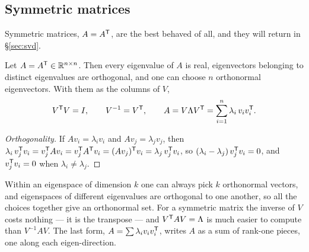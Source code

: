 \documentclass[11pt]{article}
\begin{document}
\subsection{Symmetric matrices}\label{sec:symmetric}
Symmetric matrices, $A=A^{\mathsf{T}}$, are the best behaved of all, and they will return in
\S\ref{sec:svd}.
\begin{theorem}\label{thm:spectral}
Let $A=A^{\mathsf{T}}\in\mathbb{R}^{n\times n}$. Then every eigenvalue of $A$ is real, eigenvectors
belonging to distinct eigenvalues are orthogonal, and one can choose $n$
orthonormal eigenvectors. With them as the columns of $V$,
\[
   V^{\mathsf{T}} V=I,\qquad V^{-1}=V^{\mathsf{T}},\qquad
   A = V\Lambda V^{\mathsf{T}} = \sum_{i=1}^{n}\lambda_i\,v_iv_i^{\mathsf{T}} .
\]
\end{theorem}
\begin{proof}[Orthogonality]
If $Av_i=\lambda_iv_i$ and $Av_j=\lambda_jv_j$, then
$\lambda_i\,v_j^{\mathsf{T}} v_i = v_j^{\mathsf{T}} Av_i = v_j^{\mathsf{T}} A^{\mathsf{T}} v_i = (Av_j)^{\mathsf{T}} v_i
= \lambda_j\,v_j^{\mathsf{T}} v_i$, so $(\lambda_i-\lambda_j)\,v_j^{\mathsf{T}} v_i=0$, and
$v_j^{\mathsf{T}} v_i=0$ when $\lambda_i\neq\lambda_j$.
\end{proof}
Within an eigenspace of dimension $k$ one can always pick $k$ orthonormal vectors,
and eigenspaces of different eigenvalues are orthogonal to one another, so all the
choices together give an orthonormal set. For a symmetric matrix the inverse of
$V$ costs nothing --- it is the transpose --- and $V^{\mathsf{T}} AV=\Lambda$ is much easier
to compute than $V^{-1}AV$. The last form, $A=\sum\lambda_iv_iv_i^{\mathsf{T}}$, writes $A$ as a
sum of rank-one pieces, one along each eigen-direction.
\end{document}

